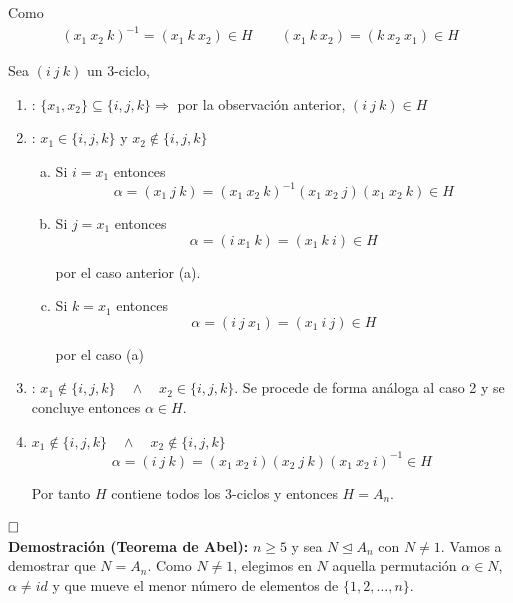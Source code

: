 \documentclass{article}
\begin{document}
Como 
\begin{gather*}
(x_1\:x_2\:k)^{-1}=(x_1\:k\:x_2)\in H \qquad
(x_1\:k\:x_2)=(k\:x_2\:x_1)\in H
\end{gather*}

Sea $(i\:j\:k)$ un 3-ciclo,

\begin{enumerate}[\bfseries C{a}so 1]
\item : $\{x_1,x_2\}\subseteq \{i,j,k\}\Rightarrow$ por la observación anterior, $(i\:j\:k)\in H$

\item : $x_1\in \{i,j,k\}$ y $x_2\notin\{i,j,k\}$
	\begin{enumerate}[a)]
	\item Si $i=x_1$ entonces
	\begin{equation*}
	\alpha=(x_1\:j\:k)=(x_1\:x_2\:k)^{-1}(x_1\:x_2\:j)(x_1\:x_2\:k)\in H
	\end{equation*}
	
	\item Si $j=x_1$ entonces
	\begin{equation*}
	\alpha =(i\:x_1\:k)=(x_1\:k\:i)\in H
	\end{equation*}
	
	por el caso anterior (a).
	
	\item Si $k=x_1$ entonces
	\begin{equation*}
	\alpha=(i\:j\:x_1)=(x_1\:i\:j)\in H
	\end{equation*}
	
	por el caso (a)
	\end{enumerate}

\item : $x_1\notin \{i,j,k\}\quad\wedge\quad x_2\in\{i,j,k\}$. Se procede de forma análoga al caso 2 y se concluye entonces $\alpha\in H$.

\item $x_1\notin \{i,j,k\} \quad \wedge\quad x_2\notin\{i,j,k\}$
\begin{equation*}
\alpha=(i\:j\:k)=(x_1\:x_2\:i)(x_2\:j\:k)(x_1\:x_2\:i)^{-1}\in H
\end{equation*}

Por tanto $H$ contiene todos los 3-ciclos y entonces $H=A_n$.
\end{enumerate}

$\hfill\square$ \\

\textbf{Demostración (Teorema de Abel):} $n\geq 5$ y sea $N\unlhd A_n$ con $N\neq 1$. Vamos a demostrar que $N=A_n$. Como $N\neq 1$, elegimos en $N$ aquella permutación $\alpha \in N$, $\alpha \neq id$ y que mueve el menor número de elementos de $\{1,2,\ldots,n\}$. 
\end{document}
